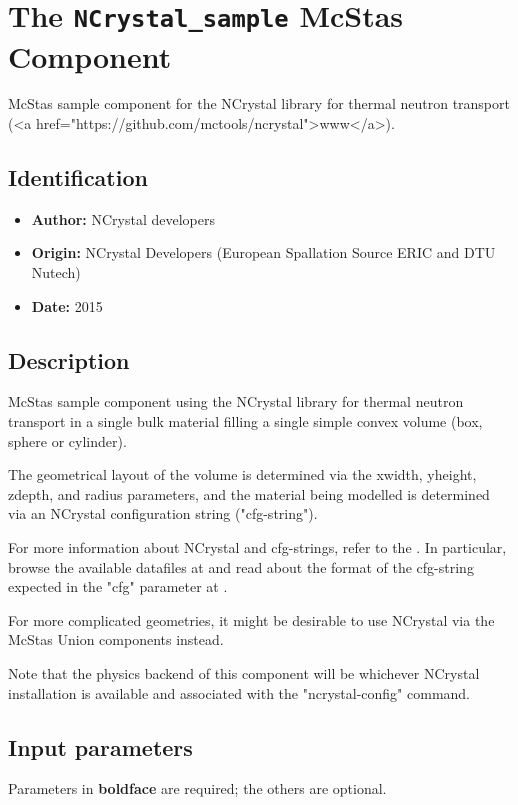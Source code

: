 \section{The \texttt{NCrystal\_sample} McStas Component}
McStas sample component for the NCrystal library for thermal neutron transport
(\textless{}a href="https://github.com/mctools/ncrystal"\textgreater{}www\textless{}/a\textgreater{}).

\subsection*{Identification}
\begin{itemize}
  \item \textbf{Author:} NCrystal developers
  \item \textbf{Origin:} NCrystal Developers (European Spallation Source ERIC and DTU Nutech)
  \item \textbf{Date:} 2015
\end{itemize}

\subsection*{Description}
McStas sample component using the NCrystal library for thermal neutron transport in a single bulk material filling a single simple convex volume (box, sphere or cylinder).

The geometrical layout of the volume is determined via the xwidth, yheight, zdepth, and radius parameters, and the material being modelled is determined via an NCrystal configuration string ("cfg-string").

For more information about NCrystal and cfg-strings, refer to the . In particular, browse the available datafiles at  and read about the format of the cfg-string expected in the "cfg" parameter at .

For more complicated geometries, it might be desirable to use NCrystal via the McStas Union components instead.

Note that the physics backend of this component will be whichever NCrystal installation is available and associated with the "ncrystal-config" command.

\subsection*{Input parameters}
Parameters in \textbf{boldface} are required; the others are optional.

